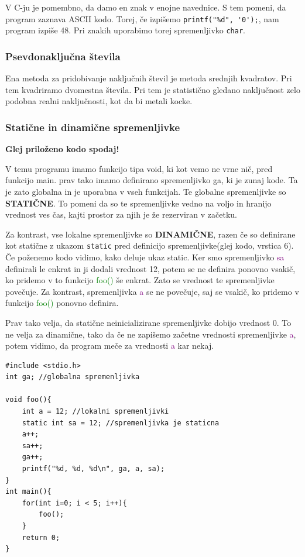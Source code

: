 \documentclass[a4paper, 12pt]{article}
\begin{document}
V C-ju je pomembno, da damo en znak v enojne navednice. S tem pomeni, da program zaznava ASCII kodo. Torej, če izpišemo \lstinline|printf("%d", '0');|, nam program izpiše 48. Pri znakih uporabimo torej spremenljivko \lstinline|char|.

\subsubsection{Psevdonaključna števila}
Ena metoda za pridobivanje naključnih števil je metoda srednjih kvadratov.
Pri tem kvadriramo dvomestna števila. Pri tem je statistično gledano naključnost zelo podobna realni naključnosti, kot da bi metali kocke.

\subsubsection{Statične in dinamične spremenljivke}
\textbf{Glej priloženo kodo spodaj!}

V temu programu imamo funkcijo tipa void, ki kot vemo ne vrne nič, pred funkcijo main. prav tako imamo definirano spremenljivko ga, ki je zunaj kode. Ta je zato globalna in je uporabna v vseh funkcijah. Te globalne spremenljivke so \textbf{STATIČNE}. To pomeni da so te spremenljivke vedno na voljo in hranijo vrednost ves čas, kajti prostor za njih je že rezerviran v začetku.

Za kontrast, vse lokalne spremenljivke so \textbf{DINAMIČNE}, razen če so definirane kot statične z ukazom \lstinline|static| pred definicijo spremenljivke(glej kodo, vrstica 6). Če poženemo kodo vidimo, kako deluje ukaz static. Ker smo spremenljivko \textcolor{purple}{sa} definirali le enkrat in ji dodali vrednost 12, potem se ne definira ponovno vsakič, ko pridemo v to funkcijo \textcolor{green}{foo()} še enkrat. Zato se vrednost te spremenljivke povečuje. Za kontrast, spremenljivka \textcolor{purple}{a} se ne povečuje, saj se vsakič, ko pridemo v funkcijo \textcolor{green}{foo()} ponovno definira.

Prav tako velja, da statične neinicializirane spremenljivke dobijo vrednost 0. To ne velja za dinamične, tako da če ne zapišemo začetne vrednosti spremenljivke \textcolor{purple}{a}, potem vidimo, da program meče za vrednosti \textcolor{purple}{a} kar nekaj.

\pagebreak

\begin{lstlisting}[caption = Statične in dinamične spremenljivke]
#include <stdio.h>
int ga; //globalna spremenljivka

void foo(){
	int a = 12;	//lokalni spremenljivki
	static int sa = 12; //spremenljivka je staticna
	a++;
	sa++;
	ga++;
	printf("%d, %d, %d\n", ga, a, sa);
}
int main(){
	for(int i=0; i < 5; i++){
		foo();
	}
	return 0;
}	
\end{lstlisting}
\end{document}
